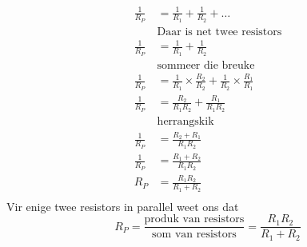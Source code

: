 \begin{align*}
\frac{1}{R_P}&=\frac{1}{R_1}+\frac{1}{R_2}+\ldots \\
&\text{Daar is net twee resistors}\\
\frac{1}{R_P}&=\frac{1}{R_1}+\frac{1}{R_2}\\
&\text{sommeer die breuke}\\
\frac{1}{R_P}&=\frac{1}{R_1}\times\frac{R_2}{R_2}+\frac{1}{R_2}\times\frac{R_1}{
R_1}\\ 
\frac{1}{R_P}&=\frac{R_2}{R_1R_2}+\frac{R_1}{R_1R_2}\\ 
&\text{herrangskik}\\
\frac{1}{R_P}&=\frac{R_2+R_1}{R_1R_2}\\ 
\frac{1}{R_P}&=\frac{R_1+R_2}{R_1R_2}\\ 
R_P&=\frac{R_1R_2}{R_1+R_2}\\ 
\end{align*}
Vir enige twee resistors in parallel weet ons dat 
\begin{equation*}
R_P=\frac{\text{produk van resistors}}{\text{som van
resistors}}=\frac{R_1R_2}{R_1+R_2}
\end{equation*}
\vspace{1cm}
